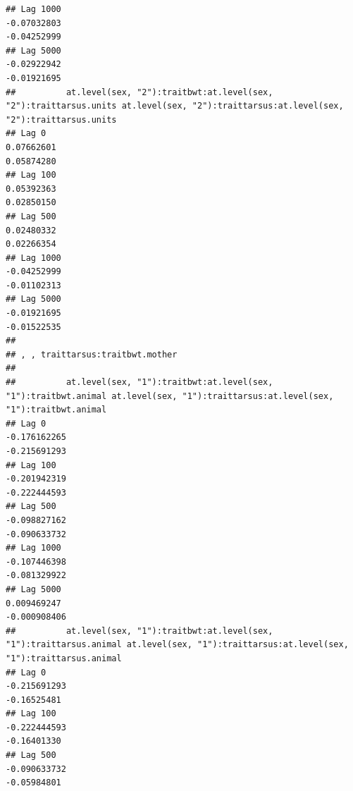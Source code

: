 \documentclass[
  12pt,
]{book}
\begin{document}
\begin{verbatim}
## Lag 1000                                                   -0.07032803                                                      -0.04252999
## Lag 5000                                                   -0.02922942                                                      -0.01921695
##          at.level(sex, "2"):traitbwt:at.level(sex, "2"):traittarsus.units at.level(sex, "2"):traittarsus:at.level(sex, "2"):traittarsus.units
## Lag 0                                                          0.07662601                                                          0.05874280
## Lag 100                                                        0.05392363                                                          0.02850150
## Lag 500                                                        0.02480332                                                          0.02266354
## Lag 1000                                                      -0.04252999                                                         -0.01102313
## Lag 5000                                                      -0.01921695                                                         -0.01522535
## 
## , , traittarsus:traitbwt.mother
## 
##          at.level(sex, "1"):traitbwt:at.level(sex, "1"):traitbwt.animal at.level(sex, "1"):traittarsus:at.level(sex, "1"):traitbwt.animal
## Lag 0                                                      -0.176162265                                                      -0.215691293
## Lag 100                                                    -0.201942319                                                      -0.222444593
## Lag 500                                                    -0.098827162                                                      -0.090633732
## Lag 1000                                                   -0.107446398                                                      -0.081329922
## Lag 5000                                                    0.009469247                                                      -0.000908406
##          at.level(sex, "1"):traitbwt:at.level(sex, "1"):traittarsus.animal at.level(sex, "1"):traittarsus:at.level(sex, "1"):traittarsus.animal
## Lag 0                                                         -0.215691293                                                          -0.16525481
## Lag 100                                                       -0.222444593                                                          -0.16401330
## Lag 500                                                       -0.090633732                                                          -0.05984801

\end{verbatim}
\end{document}
